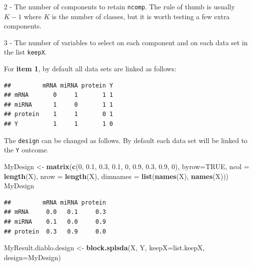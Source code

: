 \documentclass[]{book}
\newenvironment{Shaded}{\begin{snugshade}}{\end{snugshade}}
\newcommand{\KeywordTok}[1]{\textcolor[rgb]{0.13,0.29,0.53}{\textbf{#1}}}
\newcommand{\DataTypeTok}[1]{\textcolor[rgb]{0.13,0.29,0.53}{#1}}
\newcommand{\DecValTok}[1]{\textcolor[rgb]{0.00,0.00,0.81}{#1}}
\newcommand{\FloatTok}[1]{\textcolor[rgb]{0.00,0.00,0.81}{#1}}
\newcommand{\StringTok}[1]{\textcolor[rgb]{0.31,0.60,0.02}{#1}}
\newcommand{\OtherTok}[1]{\textcolor[rgb]{0.56,0.35,0.01}{#1}}
\newcommand{\OperatorTok}[1]{\textcolor[rgb]{0.81,0.36,0.00}{\textbf{#1}}}
\newcommand{\NormalTok}[1]{#1}
\theoremstyle{definition}
\theoremstyle{definition}
\theoremstyle{definition}
\theoremstyle{remark}
\begin{document}
2 - The number of components to retain \texttt{ncomp}. The rule of thumb
is usually \(K-1\) where \(K\) is the number of classes, but it is worth
testing a few extra components.

3 - The number of variables to select on each component and on each data
set in the list \texttt{keepX}.

For \textbf{item 1}, by default all data sets are linked as follows:

\begin{Shaded}
\end{Shaded}

\begin{verbatim}
##         mRNA miRNA protein Y
## mRNA       0     1       1 1
## miRNA      1     0       1 1
## protein    1     1       0 1
## Y          1     1       1 0
\end{verbatim}

The \texttt{design} can be changed as follows. By default each data set
will be linked to the \texttt{Y} outcome.

\begin{Shaded}
\begin{Highlighting}[]
\NormalTok{MyDesign <-}\StringTok{ }\KeywordTok{matrix}\NormalTok{(}\KeywordTok{c}\NormalTok{(}\DecValTok{0}\NormalTok{, }\FloatTok{0.1}\NormalTok{, }\FloatTok{0.3}\NormalTok{,}
                     \FloatTok{0.1}\NormalTok{, }\DecValTok{0}\NormalTok{, }\FloatTok{0.9}\NormalTok{,}
                     \FloatTok{0.3}\NormalTok{, }\FloatTok{0.9}\NormalTok{, }\DecValTok{0}\NormalTok{),}
                   \DataTypeTok{byrow=}\OtherTok{TRUE}\NormalTok{,}
                   \DataTypeTok{ncol =} \KeywordTok{length}\NormalTok{(X), }\DataTypeTok{nrow =} \KeywordTok{length}\NormalTok{(X),}
                 \DataTypeTok{dimnames =} \KeywordTok{list}\NormalTok{(}\KeywordTok{names}\NormalTok{(X), }\KeywordTok{names}\NormalTok{(X)))}
\NormalTok{MyDesign}
\end{Highlighting}
\end{Shaded}

\begin{verbatim}
##         mRNA miRNA protein
## mRNA     0.0   0.1     0.3
## miRNA    0.1   0.0     0.9
## protein  0.3   0.9     0.0
\end{verbatim}

\begin{Shaded}
\begin{Highlighting}[]
\NormalTok{MyResult.diablo.design <-}\StringTok{ }\KeywordTok{block.splsda}\NormalTok{(X, Y, }\DataTypeTok{keepX=}\NormalTok{list.keepX, }\DataTypeTok{design=}\NormalTok{MyDesign)}
\end{Highlighting}
\end{Shaded}
\end{document}
